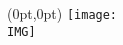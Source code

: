 \documentclass[oneside,final,12pt]{article}
\newlength\imageheight
\newlength\imagewidth
\begin{document}




\begin{textblock*}{\textwidth}(0pt,0pt)
	\texttt{[image: \\IMG]}%
\end{textblock*}


%
\end{document}
